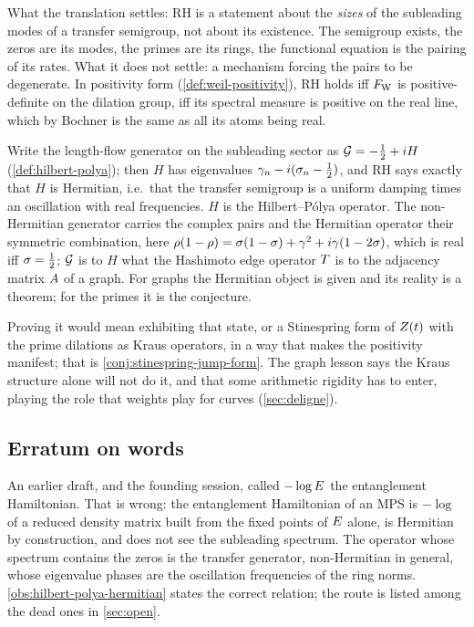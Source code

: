 What the translation settles: RH is a statement about the \emph{sizes} of the
subleading modes of a transfer semigroup, not about its existence. The semigroup
exists, the zeros are its modes, the primes are its rings, the functional equation is
the pairing of its rates. What it does not settle: a mechanism forcing the pairs to be
degenerate. In positivity form (\cref{def:weil-positivity}), RH holds iff $F_{\mathrm W}$ is
positive-definite on the dilation group, iff its spectral measure is positive on the
real line, which by Bochner is the same as all its atoms being real.

\begin{observation}
\label{obs:hilbert-polya-hermitian}
Write the length-flow generator on the subleading sector as $\mathcal G = -\tfrac12 +
iH$ (\cref{def:hilbert-polya}); then $H$ has eigenvalues $\gamma_n -
i(\sigma_n-\tfrac12)$, and RH says exactly that $H$ is Hermitian, i.e.\ that the
transfer semigroup is a uniform damping times an oscillation with real frequencies.
$H$ is the Hilbert--P\'olya operator. The non-Hermitian generator carries the complex
pairs and the Hermitian operator their symmetric combination, here $\rho(1-\rho) =
\sigma(1-\sigma) + \gamma^2 + i\gamma(1-2\sigma)$, which is real iff $\sigma = \tfrac12$;
$\mathcal G$ is to $H$ what the Hashimoto edge operator $T$ is to the adjacency
matrix $A$ of a graph. For graphs the Hermitian object is given and its reality is
a theorem; for the primes it is the conjecture.
\end{observation}

Proving it would mean exhibiting that state, or a Stinespring form of $Z(t)$ with the
prime dilations as Kraus operators, in a way that makes the positivity manifest; that
is \cref{conj:stinespring-jump-form}. The graph lesson says the Kraus structure alone
will not do it, and that some arithmetic rigidity has to enter, playing the role that
weights play for curves (\cref{sec:deligne}).

\subsection{Erratum on words}

An earlier draft, and the founding session, called $-\log E$ the entanglement
Hamiltonian. That is wrong: the entanglement Hamiltonian of an MPS is $-\log$ of a
reduced density matrix built from the fixed points of $E$ alone, is Hermitian by
construction, and does not see the subleading spectrum. The operator whose spectrum
contains the zeros is the transfer generator, non-Hermitian in general, whose
eigenvalue phases are the oscillation frequencies of the ring norms.
\cref{obs:hilbert-polya-hermitian} states the correct relation; the route is listed
among the dead ones in \cref{sec:open}.

